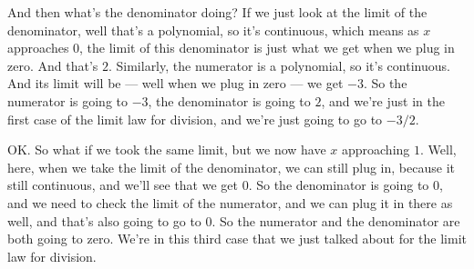 \documentclass[pdftex, brazil, 12pt, twoside]{article}
\begin{document}
And then what's the denominator doing?
If we just look at the limit of the denominator,
well that's a polynomial, so it's continuous,
which means as $x$ approaches $0$, the limit of this denominator
is just what we get when we plug in zero.
And that's $2$.
Similarly, the numerator is a polynomial, so it's continuous.
And its limit will be --- well when we
plug in zero --- we get $-3$.
So the numerator is going to $-3$,
the denominator is going to $2$, and we're just
in the first case of the limit law for division,
and we're just going to go to $-3/2$.

\begin{figure}[H]
  \begin{center}
  \end{center}
\end{figure}

OK.
So what if we took the same limit,
but we now have $x$ approaching $1$.
Well, here, when we take the limit of the denominator,
we can still plug in, because it still continuous,
and we'll see that we get $0$.
So the denominator is going to $0$,
and we need to check the limit of the numerator,
and we can plug it in there as well,
and that's also going to go to $0$.
So the numerator and the denominator
are both going to zero.
We're in this third case that we just
talked about for the limit law for division.

\begin{figure}[H]
  \begin{center}
  \end{center}
\end{figure}
\end{document}
